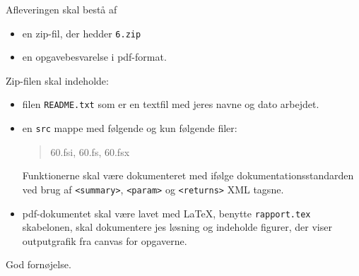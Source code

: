 \documentclass[a4paper,12pt]{article}
\newcommand{\exerciseNumber}{6}
\begin{document}
Afleveringen skal bestå af
\begin{itemize}
  \item en zip-fil, der hedder \texttt{\exerciseNumber\typeLetter.zip}
  \item en opgavebesvarelse i pdf-format.
\end{itemize}
Zip-filen skal indeholde:
\begin{itemize}
\item filen \texttt{README.txt} som er en textfil med jeres navne og dato arbejdet.
\item en \texttt{src} mappe med følgende og kun
  følgende filer:
  \begin{quote}
    \exerciseNumber\typeLetter0.fsi, \exerciseNumber\typeLetter0.fs, \exerciseNumber\typeLetter0.fsx
  \end{quote}
  Funktionerne skal være dokumenteret med ifølge dokumentationsstandarden ved brug af \verb|<summary>|, \verb|<param>| og \verb|<returns>| XML tagsne.
  \item pdf-dokumentet skal være lavet med \LaTeX, benytte \lstinline[language=console]{rapport.tex} skabelonen, skal dokumentere jes løsning og indeholde figurer, der viser outputgrafik fra canvas for opgaverne.
\end{itemize}

\flushright God fornøjelse.
\end{document}

